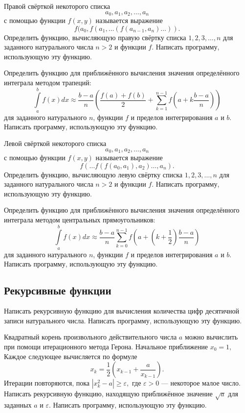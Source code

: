 \task Правой свёрткой некоторого списка
\[
a_0, a_1, a_2, \ldots, a_n
\]
с помощью функции $f(x, y)$ называется выражение
\[
f(a_0, f(a_1, \ldots (f(a_{n-1}, a_n) \ldots)). 
\]
Определить функцию, вычисляющую правую свёртку списка $1, 2, 3,
\ldots, n$ для заданного натурального числа $n > 2$ и функции
$f$. Написать программу, использующую эту функцию.

\task Определить функцию для приближённого вычисления значения
определённого интеграла методом трапеций:
\[
\int\limits_a^b f(x) dx \approx
\frac{b-a}{n}\left(
\frac{f(a)+f(b)}2 + \sum_{k=1}^{n-1} f \left(a + k\frac{b-a}{n}\right)
\right)
\]
для заданного натурального $n$, функции $f$ и пределов интегрирования
$a$ и $b$.  Написать программу, использующую эту функцию.

\task Левой свёрткой некоторого списка
\[
a_0, a_1, a_2, \ldots, a_n
\]
с помощью функции $f(x, y)$ называется выражение
\[
f(\ldots f(f(a_0, a_1), a_2) \ldots, a_n). 
\]
Определить функцию, вычисляющую левую свёртку списка $1, 2, 3, \ldots,
n$ для заданного натурального числа $n > 2$ и функции $f$. Написать
программу, использующую эту функцию.

\task Определить функцию для приближённого вычисления значения
определённого интеграла методом центральных прямоугольников:
\[
\int\limits_a^b f(x) dx \approx
\frac{b-a}{n}\sum_{k=0}^{n-1} f \left(
a + \left(k+\frac{1}{2}\right)\frac{b-a}{n}
\right)
\]
для заданного натурального $n$, функции $f$ и пределов интегрирования
$a$ и $b$.  Написать программу, использующую эту функцию.


\subsection{Рекурсивные функции}

\task Написать рекурсивную функцию для вычисления количества цифр
десятичной записи натурального числа. Написать программу, использующую
эту функцию.

\task Квадратный корень произвольного действительного числа $a$ можно
вычислить при помощи итерационного метода Герона. Начальное
приближение $x_0 = 1,$ Каждое следующее вычисляется по формуле
\[
x_k = \frac12 \left( x_{k-1} + \frac{a}{x_{k-1}} \right).
\]
Итерации повторяются, пока $\left| x_k^2 - a \right| \geqslant
\varepsilon,$ где $\varepsilon > 0$ — некоторое малое число.  Написать
рекурсивную функцию, находящую приближённое значение $\sqrt{a}$ для
заданных $a$ и $\varepsilon.$ Написать программу, использующую эту
функцию.

